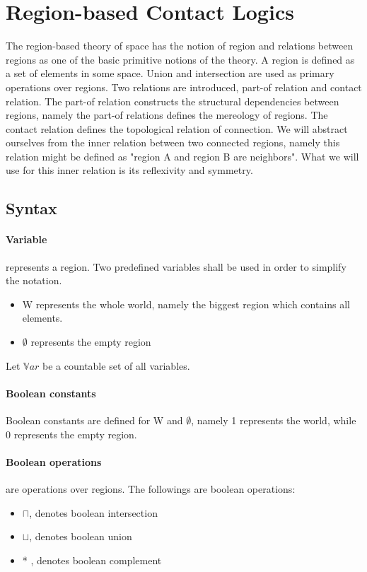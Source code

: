 \documentclass{article}
\begin{document}
	\section{Region-based Contact Logics}
The region-based theory of space has the notion of region and relations between regions as one of the basic primitive notions of the theory.
A region is defined as a set of elements in some space. Union and intersection are used as primary operations over regions.
Two relations are introduced, part-of relation and contact relation. 
The part-of relation constructs the structural dependencies between regions, namely the part-of relations defines the mereology of regions.
The contact relation defines the topological relation of connection. We will abstract ourselves from the inner relation between two connected regions, namely
this relation might be defined as "region A and region B are neighbors". What we will use for this inner relation is its reflexivity and symmetry.
	
	\subsection{Syntax}
	\paragraph{Variable} 
represents a region. Two predefined variables shall be used in order to simplify the notation. 
		\begin{itemize}
			\item W represents the whole world, namely the biggest region which contains all elements.
			\item $\emptyset$ represents the empty region
		\end{itemize}
Let $\mathbb{V}ar$ be a countable set of all variables.

	\paragraph{Boolean constants}
Boolean constants are defined for W and $\emptyset$, namely 1 represents the world, while 0 represents the empty region.

	\paragraph{Boolean operations}
are operations over regions. The followings are boolean operations:
		\begin{itemize}
			\item $\sqcap$, denotes boolean intersection
			\item $\sqcup$, denotes boolean union
			\item * , denotes boolean complement
		\end{itemize}
\end{document}

